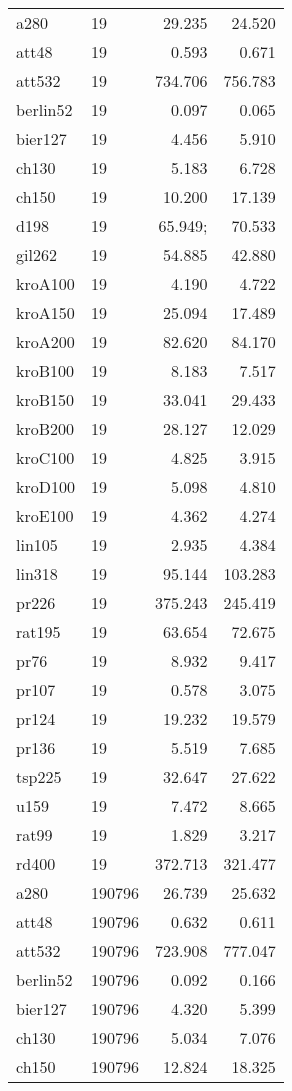 \begin{center}
\begin{longtable}{llrr}
a280 & 19 & 29.235 & 24.520 \\
att48  & 19 & 0.593 & 0.671 \\
att532  & 19 & 734.706&756.783\\
berlin52  & 19 & 0.097& 0.065\\
bier127  & 19 & 4.456& 5.910\\
ch130  & 19 & 5.183& 6.728\\
ch150  & 19 & 10.200& 17.139\\
d198  & 19 & 65.949;&70.533\\
gil262  & 19 & 54.885&42.880\\
kroA100  & 19 & 4.190&4.722\\
kroA150  & 19 & 25.094&17.489\\
kroA200  & 19 & 82.620& 84.170\\
kroB100  & 19 & 8.183&7.517\\
kroB150 & 19 & 33.041& 29.433\\
kroB200  & 19 & 28.127& 12.029\\
kroC100  & 19 & 4.825& 3.915\\
kroD100 & 19 & 5.098& 4.810\\
kroE100  & 19 & 4.362& 4.274\\
lin105  & 19 & 2.935& 4.384\\
lin318  & 19 & 95.144& 103.283\\
pr226  & 19 & 375.243& 245.419\\
rat195  & 19 & 63.654& 72.675\\
pr76  & 19 & 8.932& 9.417\\
pr107  & 19 & 0.578 & 3.075\\
pr124  & 19 & 19.232 & 19.579\\
pr136  & 19 & 5.519& 7.685\\
tsp225  & 19 & 32.647& 27.622\\
u159  & 19 & 7.472& 8.665\\
rat99  & 19 & 1.829& 3.217\\
rd400  & 19 & 372.713& 321.477\\
a280 & 190796 & 26.739& 25.632\\
att48  & 190796 & 0.632& 0.611\\
att532  & 190796 &723.908& 777.047\\
berlin52  & 190796 & 0.092& 0.166\\
bier127  & 190796 & 4.320& 5.399\\
ch130  & 190796 & 5.034& 7.076\\
ch150  & 190796 & 12.824& 18.325\\

\end{longtable}
\end{center}
